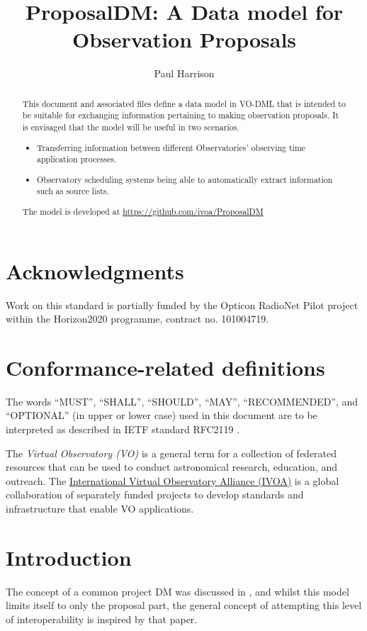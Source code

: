 \documentclass[10pt,a4paper]{ivoa}
\title{ProposalDM: A Data model for Observation Proposals}
\author[????URL????]{Paul Harrison}
\begin{document}
\begin{abstract}
This document and associated files define a data model in VO-DML that is intended to be suitable for exchanging
    information pertaining to making observation proposals. It is envisaged that the model will be useful in two scenarios.
\begin{itemize}
    \item Transferring information between different Observatories' observing time application processes.
    \item Observatory scheduling systems being able to automatically extract information such as source lists.
\end{itemize}

    The model is developed at \url{https://github.com/ivoa/ProposalDM}
\end{abstract}


\section*{Acknowledgments}

Work on this standard is partially funded by the Opticon RadioNet Pilot project within the Horizon2020 programme, contract no. 101004719.

\section*{Conformance-related definitions}

The words ``MUST'', ``SHALL'', ``SHOULD'', ``MAY'', ``RECOMMENDED'', and
``OPTIONAL'' (in upper or lower case) used in this document are to be
interpreted as described in IETF standard RFC2119 \citep{std:RFC2119}.

The \emph{Virtual Observatory (VO)} is a
general term for a collection of federated resources that can be used
to conduct astronomical research, education, and outreach.
The \href{https://www.ivoa.net}{International
Virtual Observatory Alliance (IVOA)} is a global
collaboration of separately funded projects to develop standards and
infrastructure that enable VO applications.


\section{Introduction}


The concept of a common project DM was discussed in \cite{2008SPIE.7019E..0PB}, and whilst this model limits itself to
only the proposal part, the general concept of attempting this level of interoperability is inspired by that paper.
\end{document}
